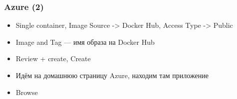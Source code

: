 \documentclass{../../slides-style}
\begin{document}
    \begin{frame}
        \frametitle{Azure (2)}
        \begin{itemize}
            \item Single container, Image Source -> Docker Hub, Access Type -> Public
            \item Image and Tag --- имя образа на Docker Hub
            \item Review + create, Create
            \item Идём на домашнюю страницу Azure, находим там приложение
            \item Browse
        \end{itemize}
    \end{frame}
\end{document}

